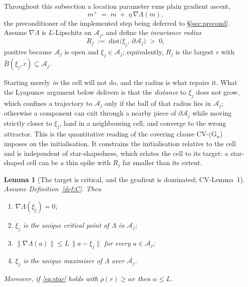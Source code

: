 \documentclass[11pt]{article}
\newtheorem{lemma}[theorem]{Lemma}
\theoremstyle{definition}
\newcommand{\cA}{\mathcal{A}}
\newcommand{\CV}[1]{\textsf{CV-#1}}
\begin{document}
Throughout this subsection a location parameter runs plain gradient ascent,
\begin{equation}\label{eq:update}
  m^+ \;=\; m \;+\; \eta\,\nabla\Lambda(m),
\end{equation}
the preconditioner of the implemented step being deferred to \S\ref{sec:precond}.
Assume $\nabla\Lambda$ is $L$-Lipschitz on $\cA_j$, and define the
\emph{invariance radius}
\begin{equation}\label{eq:Rj}
  R_j \;:=\; \mathrm{dist}\big(\xi_j,\, \partial\cA_j\big) \;>\; 0,
\end{equation}
positive because $\cA_j$ is open and $\xi_j \in \cA_j$; equivalently, $R_j$ is the
largest $r$ with $\overline{B}(\xi_j, r) \subseteq \cA_j$.

Starting merely \emph{in} the cell will not do, and the radius is what repairs it.
What the Lyapunov argument below delivers is that the \emph{distance} to $\xi_j$
does not grow, which confines a trajectory to $\cA_j$ only if the ball of that
radius lies in $\cA_j$; otherwise a component can exit through a nearby piece of
$\partial\cA_j$ while moving strictly closer to $\xi_j$, land in a neighbouring
cell, and converge to the wrong attractor. This is the quantitative reading of the
covering clause \CV{(G$_\sigma$)} imposes on the initialisation. It constrains the
initialisation relative to the cell and is independent of star-shapedness, which
relates the cell to its target: a star-shaped cell can be a thin spike with $R_j$
far smaller than its extent.

\begin{lemma}[The target is critical, and the gradient is dominated;
\CV{Lemma~1}]\label{lem:crit}
Assume Definition~\ref{def:C}. Then
\begin{enumerate}
\item[(i)] $\nabla\Lambda(\xi_j) = 0$;
\item[(ii)] $\xi_j$ is the unique critical point of $\Lambda$ in $\cA_j$;
\item[(iii)] $\|\nabla\Lambda(a)\| \le L\,\|a - \xi_j\|$ for every
  $a \in \cA_j$;
\item[(iv)] $\xi_j$ is the unique maximiser of $\Lambda$ over
  $\overline{\cA_j}$.
\end{enumerate}
Moreover, if \eqref{eq:star} holds with $\rho(r) \ge \alpha r$ then
$\alpha \le L$.
\end{lemma}
\end{document}
